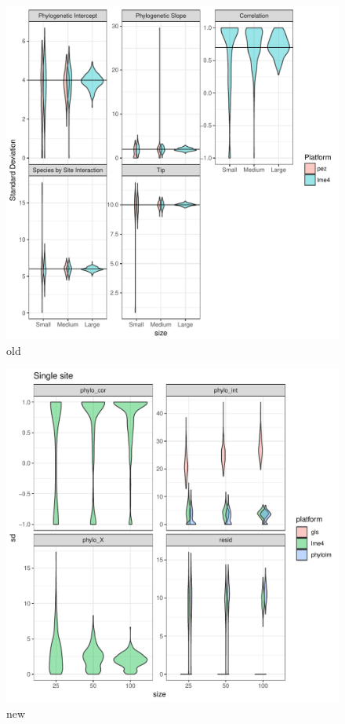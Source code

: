 \begin{center}
\begin{figure}[h]
  \includegraphics[scale=0.8,page=1]{./csplot.pdf}
  \caption{old}
\end{figure}
\end{center}

\begin{center}
\begin{figure}[h]
  \includegraphics[scale=0.8,page=2]{./git_push/plot.pdf}
  \caption{new}
\end{figure}
\end{center}

